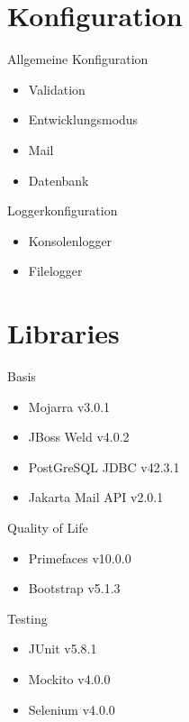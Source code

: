 \documentclass{beamer}
\begin{document}
    \section{Konfiguration}
    \begin{frame}{Allgemeine Konfiguration}
        \begin{itemize}
            \item Validation
            \pause
            \item Entwicklungsmodus
            \pause
            \item Mail
            \pause
            \item Datenbank
        \end{itemize}
    \end{frame}

    \begin{frame}{Loggerkonfiguration}
        \begin{itemize}
            \item Konsolenlogger
            \pause
            \item Filelogger
        \end{itemize}
    \end{frame}


    \section{Libraries}
    \begin{frame}{Basis}
        \begin{itemize}
            \item Mojarra v3.0.1
            \item JBoss Weld v4.0.2
            \item PostGreSQL JDBC v42.3.1
            \item Jakarta Mail API v2.0.1
        \end{itemize}
    \end{frame}

    \begin{frame}{Quality of Life}
        \begin{itemize}
            \item Primefaces v10.0.0
            \item Bootstrap v5.1.3
        \end{itemize}
    \end{frame}

    \begin{frame}{Testing}
        \begin{itemize}
            \item JUnit v5.8.1
            \item Mockito v4.0.0
            \item Selenium v4.0.0
        \end{itemize}
    \end{frame}
\end{document}
